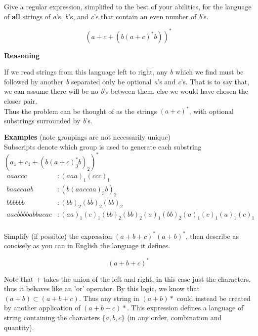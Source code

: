 \documentclass[12pt]{jhwhw}
\begin{document}
\problem{}

	Give a regular expression, simplified to the best of your abilities, for the language of \textbf{all} strings
	of \textit{a}'s, \textit{b}'s, and \textit{c}'s that contain an even number of \textit{b}'s.

\solution

	$$
		(a+c+(b(a+c)^*b))^*
	$$

	\textbf{Reasoning}

	If we read strings from this language left to right, any \textit{b} which we find must be followed by 
	another \textit{b} separated only be optional \textit{a}'s and \textit{c}'s. 
	That is to say that, we can assume there will be 
	no \textit{b}'s between them, else we would have chosen the closer pair.
	\\
	Thus the problem can be thought of as the strings $(a+c)^*$, 
	with optional substrings surrounded by \textit{b}'s.

	\bigbreak
	\textbf{Examples} (note groupings are not necessarily unique) \\
	Subscripts denote which group is used to generate each substring $(a_1+c_1+(b(a+c)_3^*b)_2)^*$ \\
	\begin{align*}
		aaaccc &: 
			(aaa)_1(ccc)_1 \\
		baaccaab &: 
			(b(aaccaa)_3b)_2 \\
		bbbbbb &: 
			(bb)_2(bb)_2(bb)_2 \\
		aacbbbbabbacac &: 
			(aa)_1(c)_1(bb)_2(bb)_2(a)_1(bb)_2(a)_1(c)_1(a)_1(c)_1 \\
	\end{align*}

\problem{}

	Simplify (if possible) the expression $(a+b+c)^*(a+b)^*$, then describe as concisely as you can
	in English the language it defines.

\solution

	$$
		(a+b+c)^*
	$$

	Note that + takes the union of the left and right, in this case just the characters, 
	thus it behaves like an 'or' operator.
	By this logic, we know that $(a+b) \subset (a+b+c)$.
	Thus any string in $(a+b)*$ could instead be created by another application of $(a+b+c)*$.
	\bigbreak
	This expression defines a language of string containing the characters $\{a,b,c\}$ (in any order, combination
	and quantity).

\problem{}
\end{document}
